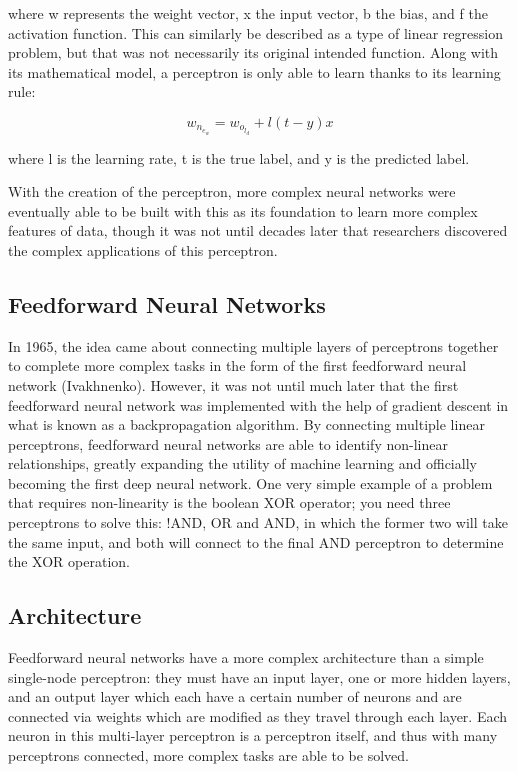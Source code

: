 \documentclass[12pt, letter]{article}
\begin{document}
\noindent where w represents the weight vector, x the input vector, b the bias, and f the activation function. This can similarly be described as a type of linear regression problem, but that was not necessarily its original intended function. Along with its mathematical model, a perceptron is only able to learn thanks to its learning rule:

\begin{equation}
w_n_e_w = w_o_l_d + l(t-y)x
\end{equation}
	
\noindent where l is the learning rate, t is the true label, and y is the predicted label. 

With the creation of the perceptron, more complex neural networks were eventually able to be built with this as its foundation to learn more complex features of data, though it was not until decades later that researchers discovered the complex applications of this perceptron. 

\subsection{Feedforward Neural Networks}

In 1965, the idea came about connecting multiple layers of perceptrons together to complete more complex tasks in the form of the first feedforward neural network (Ivakhnenko). However, it was not until much later that the first feedforward neural network was implemented with the help of gradient descent in what is known as a backpropagation algorithm. By connecting multiple linear perceptrons, feedforward neural networks are able to identify non-linear relationships, greatly expanding the utility of machine learning and officially becoming the first deep neural network. One very simple example of a problem that requires non-linearity is the boolean XOR operator; you need three perceptrons to solve this: !AND, OR and AND, in which the former two will take the same input, and both will connect to the final AND perceptron to determine the XOR operation. 


\subsection{Architecture}

Feedforward neural networks have a more complex architecture than a simple single-node perceptron: they must have an input layer, one or more hidden layers, and an output layer which each have a certain number of neurons and are connected via weights which are modified as they travel through each layer. Each neuron in this multi-layer perceptron is a perceptron itself, and thus with many perceptrons connected, more complex tasks are able to be solved. 
\end{document}
